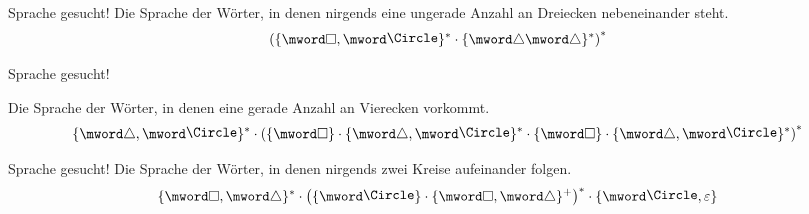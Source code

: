 \begin{frame}{Sprache gesucht!}
	Die Sprache der Wörter, in denen nirgends eine ungerade Anzahl an Dreiecken nebeneinander steht.
	\bigskip
	\pause
	$$ \left(\{\mword \square, \mword \mycircle\}^* \cdot \{\mword \triangle\mword \triangle\}^* \right)^* $$
\end{frame}

\begin{frame}{Sprache gesucht!}
	
	
	Die Sprache der Wörter, in denen eine gerade Anzahl an Vierecken vorkommt.
	\bigskip
	\pause
	$$ \{\mword \triangle, \mword \mycircle\}^* \cdot \left( \{\mword \square\} \cdot \{\mword \triangle, \mword \mycircle\}^* \cdot \{\mword \square\} \cdot \{\mword \triangle, \mword \mycircle\}^* \right)^* $$
	

\end{frame}

\begin{frame}{Sprache gesucht!}
	Die Sprache der Wörter, in denen nirgends zwei Kreise aufeinander folgen.
	\bigskip
	\pause
	$$ \{\mword \square, \mword \triangle\}^* \cdot \left( \{\mword \mycircle\} \cdot \{\mword \square, \mword \triangle\}^+ \right)^* \cdot \{\mword \mycircle, \varepsilon\} $$
	

	
\end{frame}